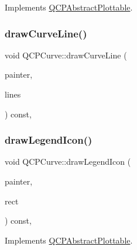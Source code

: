 Implements \hyperlink{class_q_c_p_abstract_plottable_a453f676a5cee7bf846c5f0fa05ea84b3}{Q\+C\+P\+Abstract\+Plottable}.

\mbox{\label{class_q_c_p_curve_aa4d7415f7c69eb7820263941f7d88e2c}} 
\subsubsection{\texorpdfstring{draw\+Curve\+Line()}{drawCurveLine()}}
{\footnotesize\ttfamily void Q\+C\+P\+Curve\+::draw\+Curve\+Line (\begin{DoxyParamCaption}\item[{\hyperlink{class_q_c_p_painter}{Q\+C\+P\+Painter} $\ast$}]{painter,  }\item[{const Q\+Vector$<$ Q\+PointF $>$ \&}]{lines }\end{DoxyParamCaption}) const\hspace{0.3cm}{\ttfamily [protected]}, {\ttfamily [virtual]}}

\mbox{\label{class_q_c_p_curve_aac6e94afbce4002d2cd7793250154e84}} 
\subsubsection{\texorpdfstring{draw\+Legend\+Icon()}{drawLegendIcon()}}
{\footnotesize\ttfamily void Q\+C\+P\+Curve\+::draw\+Legend\+Icon (\begin{DoxyParamCaption}\item[{\hyperlink{class_q_c_p_painter}{Q\+C\+P\+Painter} $\ast$}]{painter,  }\item[{const Q\+RectF \&}]{rect }\end{DoxyParamCaption}) const\hspace{0.3cm}{\ttfamily [protected]}, {\ttfamily [virtual]}}



Implements \hyperlink{class_q_c_p_abstract_plottable_a9a450783fd9ed539e589999fd390cdf7}{Q\+C\+P\+Abstract\+Plottable}.

\mbox{\label{class_q_c_p_curve_a0bea811373c5ee8c67c9c2b4d74ad866}} 
